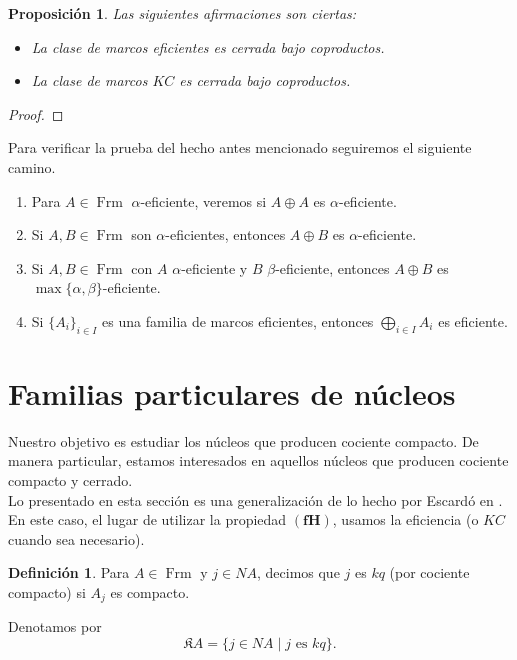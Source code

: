 \documentclass[11pt]{amsart}
\DeclareMathOperator{\Frm}{Frm}
\theoremstyle{plain}
\newtheorem{prop}[thm]{Proposición}
\theoremstyle{definition}
\newtheorem{dfn}[thm]{Definición}
\begin{document}
\begin{prop}\label{coprod}
Las siguientes afirmaciones son ciertas:
\begin{itemize}
\item[(1)] La clase de marcos eficientes es cerrada bajo coproductos.
\item[(2)] La clase de marcos $KC$ es cerrada bajo coproductos. 
\end{itemize}	
\end{prop}

\begin{proof}

\end{proof}

Para verificar la prueba del hecho antes mencionado seguiremos el siguiente camino.
\begin{enumerate}
    \item Para $A\in \Frm$ $\alpha$-eficiente, veremos si $A\oplus A$ es $\alpha$-eficiente.
    \item Si $A, B\in \Frm$ son $\alpha$-eficientes, entonces $A\oplus B$ es $\alpha$-eficiente.
    \item Si $A, B\in \Frm$ con $A$ $\alpha$-eficiente y $B$ $\beta$-eficiente, entonces $A\oplus B$ es $\max\{\alpha, \beta\}$-eficiente.
    \item Si $\{A_i\}_{i\in I}$ es una familia de marcos eficientes, entonces $\bigoplus_{i\in I} A_i$ es eficiente.
\end{enumerate}

\section{Familias particulares de núcleos}
Nuestro objetivo es estudiar los núcleos que producen cociente compacto. De manera particular, estamos interesados en 
aquellos núcleos que producen cociente compacto y cerrado.\\

Lo presentado en esta sección es una generalización de lo hecho por Escardó en \cite{escardo2006compactly}. En este caso, el lugar de utilizar la propiedad
$\mathbf{(fH)}$, usamos la eficiencia (o $KC$ cuando sea necesario).

\begin{dfn}\label{Definicion2.1}
Para $A\in \Frm$ y $j\in NA$, decimos que $j$ es $kq$ (por cociente compacto) si $A_j$ es compacto.  
\end{dfn}

Denotamos por 
\[
\mathfrak{K}A=\{j\in NA\mid j \mbox{ es } kq\}.
\]
\end{document}
